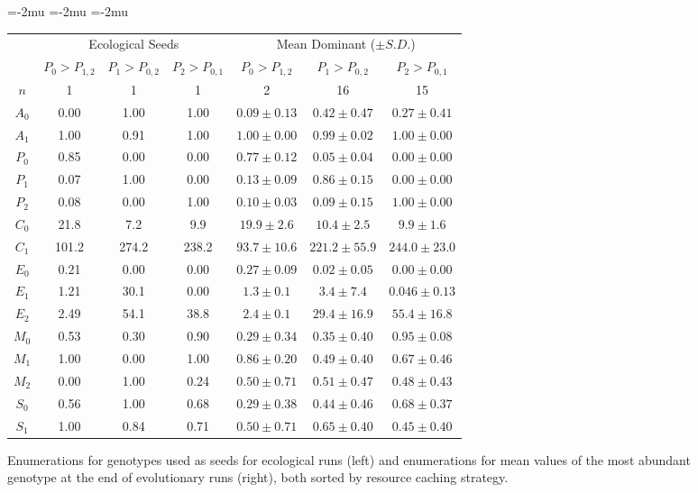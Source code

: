 \begin{figure}[t]

\begin{center}
\setlength\tabcolsep{1.5pt} %
\medmuskip=-2mu
\thinmuskip=-2mu
\thickmuskip=-2mu
\nulldelimiterspace=-1pt
\scriptspace=0pt
\begin{tabular}{ | c || c c c | c c c | }
  \multicolumn{1}{c}{} & \multicolumn{3}{c}{Ecological Seeds} & \multicolumn{3}{c}{Mean Dominant ($\pm S.D.$)} \\
 \cline{2-7}
  \multicolumn{1}{c|}{} & \tiny{$P_0 > P_{1,2}$} & \tiny{$P_1 > P_{0,2}$} & \tiny{$P_2 > P_{0,1}$} & \tiny{$P_0 > P_{1,2}$} & \tiny{$P_1 > P_{0,2}$} & \tiny{$P_2 > P_{0,1}$}  \\
 \hline
 $n$ & 1 & 1 & 1 & 2 & 16 & 15  \\
 \hhline{|=||===|===|}
 $A_0$ & 0.00 & 1.00 & 1.00 & $0.09 \pm 0.13$ & $0.42 \pm 0.47$ & $0.27 \pm 0.41$ \\
 $A_1$ & 1.00 & 0.91 & 1.00 & $1.00 \pm  0.00$ & $0.99 \pm 0.02$ & $1.00 \pm 0.00$ \\
 \hline
 $P_0$ & 0.85 & 0.00 & 0.00 & $0.77 \pm 0.12$ & $0.05 \pm 0.04$ & $0.00 \pm 0.00$ \\
 $P_1$ & 0.07 & 1.00 & 0.00 & $0.13 \pm 0.09$ & $0.86 \pm 0.15$ & $0.00 \pm 0.00$ \\
 $P_2$ & 0.08 & 0.00 & 1.00 & $0.10 \pm 0.03$ & $0.09 \pm 0.15$ & $1.00 \pm 0.00$ \\
 \hline
 $C_0$ & 21.8 & 7.2 & 9.9 & $19.9 \pm 2.6$ & $10.4 \pm 2.5$ & $9.9 \pm 1.6$ \\
 $C_1$ & 101.2 & 274.2 & 238.2 & $93.7 \pm 10.6$ & $221.2 \pm 55.9$ & $244.0 \pm 23.0 $ \\
 \hline
 $E_0$ & 0.21 & 0.00 & 0.00 & $0.27 \pm 0.09$ & $0.02 \pm 0.05$ & $0.00 \pm 0.00$ \\
 $E_1$ & 1.21 & 30.1 & 0.00 & $1.3 \pm 0.1$ & $3.4 \pm 7.4$ & $0.046 \pm 0.13$ \\
 $E_2$ & 2.49 & 54.1 & 38.8 & $2.4 \pm 0.1$ & $29.4 \pm 16.9$ & $55.4 \pm 16.8$ \\
 \hline
 $M_0$ & 0.53 & 0.30 & 0.90 & $0.29 \pm 0.34$ & $0.35 \pm 0.40$ & $0.95 \pm 0.08$ \\
 $M_1$ & 1.00 & 0.00 & 1.00 & $0.86 \pm 0.20$ & $0.49 \pm 0.40$ & $0.67 \pm 0.46$ \\
 $M_2$ & 0.00 & 1.00 & 0.24 & $0.50 \pm 0.71$ & $0.51 \pm 0.47$ & $0.48 \pm 0.43$ \\
 \hline
 $S_0$ & 0.56 & 1.00 & 0.68 & $0.29 \pm 0.38$ & $0.44 \pm 0.46$ & $0.68 \pm 0.37$ \\
 $S_1$ & 1.00 & 0.84 & 0.71 & $0.50 \pm 0.71$ & $0.65 \pm 0.40$ & $0.45 \pm 0.40$ \\
 \hline
\end{tabular}
\end{center}
\caption{
Enumerations for genotypes used as seeds for ecological runs (left) and enumerations for mean values of the most abundant genotype at the end of evolutionary runs (right), both sorted by resource caching strategy.
}
\label{fig:genotypes}
\end{figure}
